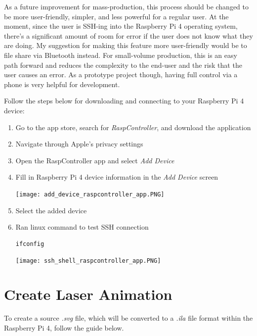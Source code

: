 \documentclass[journal]{IEEEtran}
\begin{document}
    As a future improvement for mass-production, this process should be changed to be more user-friendly, simpler, and less powerful for a regular user.
    At the moment, since the user is SSH-ing into the Raspberry Pi 4 operating system, there's a significant amount of room for error if the user does not know what they are doing.
    My suggestion for making this feature more user-friendly would be to file share via Bluetooth instead.
    For small-volume production, this is an easy path forward and reduces the complexity to the end-user and the risk that the user causes an error.
    As a prototype project though, having full control via a phone is very helpful for development.
    
    Follow the steps below for downloading and connecting to your Raspberry Pi 4 device:
    \begin{enumerate}
        \item Go to the app store, search for \emph{RaspController}, and download the application
        
        \item Navigate through Apple's privacy settings
        
        \item Open the RaspController app and select \emph{Add Device} 
        
        \item Fill in Raspberry Pi 4 device information in the \emph{Add Device} screen
        
        \texttt{[image: add\_device\_raspcontroller\_app.PNG]}
        
        \item Select the added device
        
        \item Ran linux command to test SSH connection
        
        \begin{lstlisting}[frame=single, basicstyle=\ttfamily\footnotesize, breaklines=true]
            ifconfig
        \end{lstlisting}

        \texttt{[image: ssh\_shell\_raspcontroller\_app.PNG]}
    \end{enumerate}

    \section{Create Laser Animation}
    To create a source \emph{.svg} file, which will be converted to a \emph{.ila} file format within the Raspberry Pi 4, follow the guide below.
\end{document}
